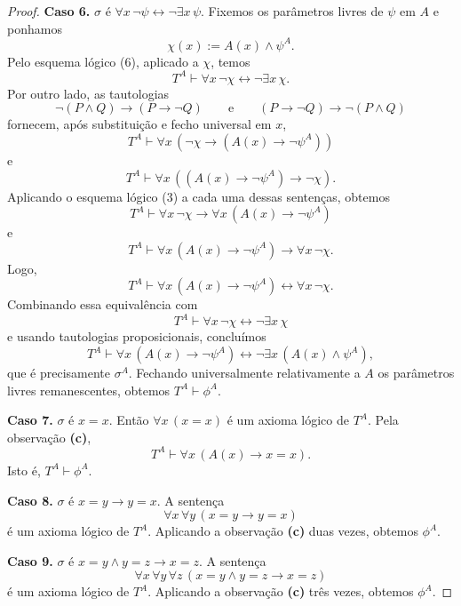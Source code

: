 \begin{proof}
    \smallskip
    \textbf{Caso 6.} $\sigma$ é $\forall x\,\neg\psi \leftrightarrow \neg \exists x\,\psi$.
    Fixemos os parâmetros livres de $\psi$ em $A$ e ponhamos
    \[
        \chi(x):= A(x)\wedge \psi^A.
    \]
    Pelo esquema lógico (6), aplicado a $\chi$, temos
    \[
        T^A\vdash \forall x\,\neg\chi \leftrightarrow \neg\exists x\,\chi.
    \]
    Por outro lado, as tautologias
    \[
        \neg(P\wedge Q)\rightarrow (P\rightarrow \neg Q)
        \qquad\text{e}\qquad
        (P\rightarrow \neg Q)\rightarrow \neg(P\wedge Q)
    \]
    fornecem, após substituição e fecho universal em $x$,
    \[
        T^A\vdash \forall x\,(\neg\chi\rightarrow (A(x)\rightarrow \neg\psi^A))
    \]
    e
    \[
        T^A\vdash \forall x\,((A(x)\rightarrow \neg\psi^A)\rightarrow \neg\chi).
    \]
    Aplicando o esquema lógico (3) a cada uma dessas sentenças, obtemos
    \[
        T^A\vdash \forall x\,\neg\chi \rightarrow \forall x\,(A(x)\rightarrow \neg\psi^A)
    \]
    e
    \[
        T^A\vdash \forall x\,(A(x)\rightarrow \neg\psi^A)\rightarrow \forall x\,\neg\chi.
    \]
    Logo,
    \[
        T^A\vdash \forall x\,(A(x)\rightarrow \neg\psi^A)\leftrightarrow \forall x\,\neg\chi.
    \]
    Combinando essa equivalência com
    \[
        T^A\vdash \forall x\,\neg\chi \leftrightarrow \neg\exists x\,\chi
    \]
    e usando tautologias proposicionais, concluímos
    \[
        T^A\vdash \forall x\,(A(x)\rightarrow \neg\psi^A)\leftrightarrow \neg\exists x\,(A(x)\wedge \psi^A),
    \]
    que é precisamente $\sigma^A$.
    Fechando universalmente relativamente a $A$ os parâmetros livres remanescentes, obtemos $T^A\vdash \phi^A$.

    \smallskip
    \textbf{Caso 7.} $\sigma$ é $x=x$.
    Então $\forall x\,(x=x)$ é um axioma lógico de $T^A$.
    Pela observação \textbf{(c)},
    \[
        T^A\vdash \forall x\,(A(x)\rightarrow x=x).
    \]
    Isto é, $T^A\vdash \phi^A$.

    \smallskip
    \textbf{Caso 8.} $\sigma$ é $x=y\rightarrow y=x$.
    A sentença
    \[
        \forall x\,\forall y\,(x=y\rightarrow y=x)
    \]
    é um axioma lógico de $T^A$.
    Aplicando a observação \textbf{(c)} duas vezes, obtemos $\phi^A$.

    \smallskip
    \textbf{Caso 9.} $\sigma$ é $x=y\wedge y=z\rightarrow x=z$.
    A sentença
    \[
        \forall x\,\forall y\,\forall z\,(x=y\wedge y=z\rightarrow x=z)
    \]
    é um axioma lógico de $T^A$.
    Aplicando a observação \textbf{(c)} três vezes, obtemos $\phi^A$.


\end{proof}
